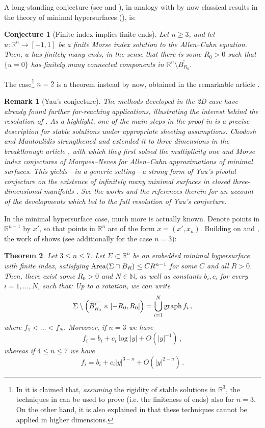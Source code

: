 \documentclass{article}
\newcommand{\N}{\mathbb{N}}
\newcommand{\R}{\mathbb{R}}
\newtheorem*{remarkx}{Remark}
\newtheorem{lconjecture}{Conjecture} %
\newtheorem{ltheorem}[lconjecture]{Theorem} %
\theoremstyle{definition}
\begin{document}
A long-standing conjecture (see \cite[Problem 6]{Wang2021} and \cite{dPKW2009survey, dPKW12, ChanWei2018}), in analogy with by now classical results in the theory of minimal hypersurfaces (\cite{CSZ97,LW02}), is:
\begin{lconjecture}[Finite index implies finite ends]\label{conj:indimpends}
    Let $n\geq 3$, and let $u:\R^n\to[-1,1]$ be a finite Morse index solution to the Allen--Cahn equation. Then, $u$ has finitely many ends, in the sense that there is some $R_0>0$ such that $\{u=0\}$ has finitely many connected components in $\R^n\setminus \overline{B_{R_0}}$.
\end{lconjecture}
The case\footnote{In \cite{Wang2021} it is claimed that, \textit{assuming} the rigidity of stable solutions in $\R^3$, the techniques in \cite{WW18,GuiWangWei2020} can be used to prove  (i.e. the finiteness of ends) also for $n=3$. On the other hand, it is also explained in \cite{Wang2021} that these techniques cannot be applied in higher dimensions.} $n=2$ is a theorem instead by now, obtained in the remarkable article \cite{WW18}.
\begin{remarkx}[Yau's conjecture]
    The methods developed in the 2D case have already found further far-reaching applications, illustrating the interest behind the resolution of . As a highlight, one of the main steps in the proof in \cite{WW18} is a precise description for stable solutions under appropriate sheeting assumptions. Chodosh and Mantoulidis strengthened and extended it to three dimensions in the breakthrough article \cite{CM20}, with which they first solved the multiplicity one and Morse index conjectures of Marques--Neves for Allen--Cahn approximations of minimal surfaces. This yields---in a generic setting---a strong form of Yau's pivotal conjecture on the existence of infinitely many minimal surfaces in closed three-dimensional manifolds \cite{Yau1982Seminar}. See the works \cite{MN16,IMN18,LMN18,Zhou2020,Song2023} and the references therein for an account of the developments which led to the full resolution of Yau's conjecture.
\end{remarkx}
In the minimal hypersurface case, much more is actually known. Denote points in $\R^{n-1}$ by $x'$, so that points in $\R^n$ are of the form $x=(x',x_n)$. Building on \cite{SSY75, SS81} and \cite{Schoen83, Anderson84}, the work of \cite{Tysk89} shows (see additionally \cite{FC85} for the case $n=3$):
\begin{ltheorem}\label{thm:TyskIndex}
    Let $3\leq n \leq 7$. Let $\Sigma\subset\R^n$ be an embedded minimal hypersurface with finite index, satisfying ${\rm Area}(\Sigma\cap B_R)\leq CR^{n-1}$ for some $C$ and all $R>0$. Then, there exist some $R_0>0$ and $N\in\N$, as well as constants $b_i,c_i$ for every $i=1,...,N$, such that: Up to a rotation, we can write
    \begin{equation}
        \Sigma \setminus \left(\overline{B_{R_0}'}\times[-R_0,R_0]\right)=\bigcup_{i=1}^N {\rm graph}\, f_i\,,
    \end{equation}
    where $f_1<...<f_N$.
    Moreover, if $n=3$ we have
    $$f_i=b_i+c_i\log|y|+O(|y|^{-1})\,,$$
    whereas if
    $4\leq n\leq 7$ we have
    $$f_i=b_i+c_i|y|^{3-n}+O(|y|^{2-n})\,.$$
\end{ltheorem}
\end{document}
